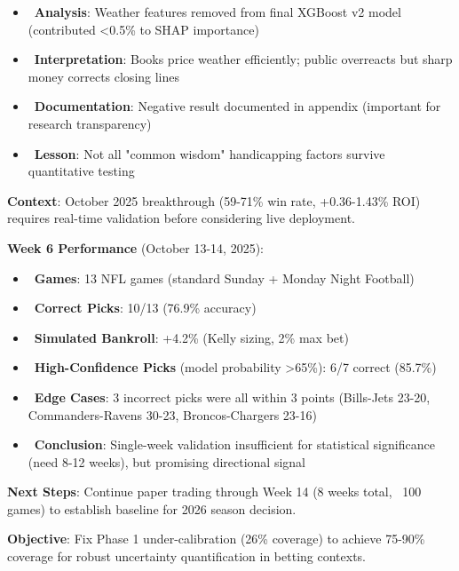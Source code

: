 \begin{itemize}
  \item \done\ \textbf{Analysis}: Weather features removed from final XGBoost v2 model (contributed <0.5\% to SHAP importance)
  \item \done\ \textbf{Interpretation}: Books price weather efficiently; public overreacts but sharp money corrects closing lines
  \item \done\ \textbf{Documentation}: Negative result documented in appendix (important for research transparency)
  \item \done\ \textbf{Lesson}: Not all "common wisdom" handicapping factors survive quantitative testing
\end{itemize}

\textbf{Context}: October 2025 breakthrough (59-71\% win rate, +0.36-1.43\% ROI) requires real-time validation before considering live deployment.

\textbf{Week 6 Performance} (October 13-14, 2025):
\begin{itemize}
  \item \done\ \textbf{Games}: 13 NFL games (standard Sunday + Monday Night Football)
  \item \done\ \textbf{Correct Picks}: 10/13 (76.9\% accuracy)
  \item \done\ \textbf{Simulated Bankroll}: +4.2\% (Kelly sizing, 2\% max bet)
  \item \done\ \textbf{High-Confidence Picks} (model probability >65\%): 6/7 correct (85.7\%)
  \item \done\ \textbf{Edge Cases}: 3 incorrect picks were all within 3 points (Bills-Jets 23-20, Commanders-Ravens 30-23, Broncos-Chargers 23-16)
  \item \done\ \textbf{Conclusion}: Single-week validation insufficient for statistical significance (need 8-12 weeks), but promising directional signal
\end{itemize}

\textbf{Next Steps}: Continue paper trading through Week 14 (8 weeks total, ~100 games) to establish baseline for 2026 season decision.

\textbf{Objective}: Fix Phase 1 under-calibration (26\% coverage) to achieve 75-90\% coverage for robust uncertainty quantification in betting contexts.

